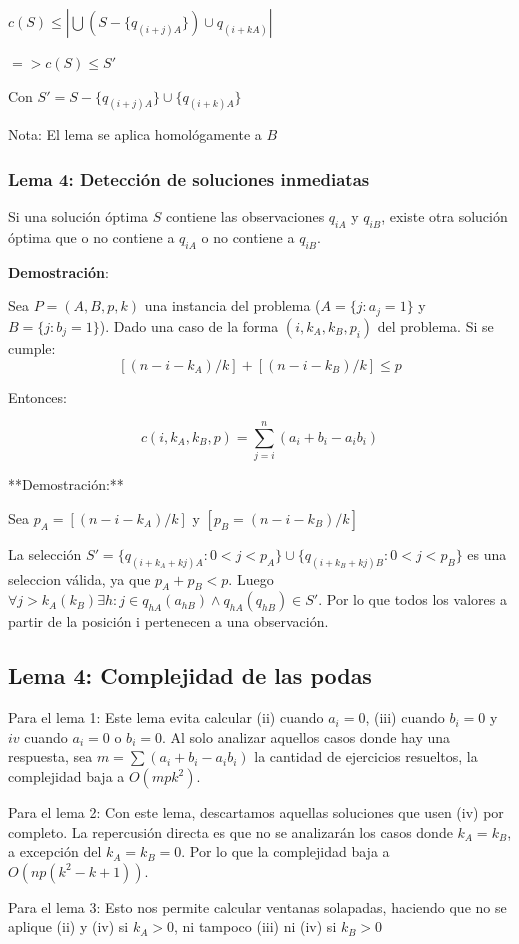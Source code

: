 \documentclass{article}
\begin{document}
$c(S)\leq|\bigcup (S-\{q_{(i+j)A}\})\cup q_{(i+kA)}|$

$=>c(S)\leq S'$

Con $S'=S-\{q_{(i+j)A}\} \cup \{q_{(i+k)A}\}$

Nota: El lema se aplica homológamente a $B$

\subsubsection{Lema 4: Detección de soluciones inmediatas}

Si una solución óptima $S$ contiene las observaciones $q_{iA}$ y $q_{iB}$, existe otra solución óptima que o no contiene a $q_{iA}$ o no contiene a $q_{iB}$.

\textbf{Demostración}:

Sea $P=(A,B,p,k)$ una instancia del problema ($A=\{j:a_j=1\}$ y $B=\{j:b_j=1\}$). Dado una caso de la forma $(i,k_A,k_B,p_i)$ del problema. Si se cumple:
$$
    [(n-i-k_A)/k]+[(n-i-k_B)/k]\leq p
$$

Entonces:

$$c(i,k_A,k_B,p)=\sum_{j=i}^n (a_i+b_i-a_ib_i)$$

**Demostración:**

Sea $p_A=[(n-i-k_A)/k]$ y $[p_B=(n-i-k_B)/k]$

La selección $S'=\{q_{(i+k_A+kj)A}:0<j<p_A\} \cup \{q_{(i+k_B+kj)B}:0<j<p_B\}$ es una seleccion válida, ya que $p_A+p_B<p$. Luego $\forall j>k_A(k_B) \exists h:j \in q_{hA}(a_{hB}) \wedge q_{hA}(q_{hB})\in S'$. Por lo que todos los valores a partir de la posición i pertenecen a una observación.

\subsection{Lema 4: Complejidad de las podas}

Para el lema 1: Este lema evita calcular (ii) cuando $a_i=0$, (iii) cuando $b_i=0$ y $iv$ cuando $a_i=0$ o $b_i=0$. Al solo analizar aquellos casos donde hay una respuesta, sea $m=\sum (a_i + b_i - a_ib_i)$ la cantidad de ejercicios resueltos, la complejidad baja a  $O(mpk^2)$.

Para el lema 2: Con este lema, descartamos aquellas soluciones que usen (iv) por completo. La repercusión directa es que no se analizarán los casos donde $k_A=k_B$, a excepción del $k_A=k_B=0$. Por lo que la complejidad baja a $O(np(k^2-k+1))$.

Para el lema 3: Esto nos permite calcular ventanas solapadas, haciendo que no se aplique (ii) y (iv) si $k_A>0$, ni tampoco (iii) ni (iv) si $k_B>0$
\end{document}
